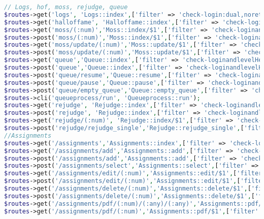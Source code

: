 \begin{lstlisting}[language=PHP, caption=Penambahan \textit{routes} yang digunakan pada aplikasi \textit{SharIF Judge}, label=kode:routesbab4]
// Logs, hof, moss, rejudge, queue
$routes->get('logs', 'Logs::index',['filter' => 'check-login:dual,noreturn']);
$routes->get('halloffame', 'Halloffame::index',['filter' => 'check-login:dual,noreturn']);
$routes->get('moss/(:num)','Moss::index/$1',['filter' => 'check-loginandlevelHead:dual,noreturn']);
$routes->post('moss/(:num)','Moss::index/$1',['filter' => 'check-loginandlevelHead:dual,noreturn']);
$routes->get('moss/update/(:num)','Moss::update/$1',['filter' => 'check-loginandlevelHead:dual,noreturn']);
$routes->post('moss/update/(:num)','Moss::update/$1',['filter' => 'check-loginandlevelHead:dual,noreturn']);
$routes->get('queue','Queue::index',['filter' => 'check-loginandlevelHead:dual,noreturn']);
$routes->post('queue','Queue::index',['filter' => 'check-loginandlevelHead:dual,noreturn']);
$routes->post('queue/resume','Queue::resume',['filter' => 'check-loginandlevelHead:dual,noreturn']);
$routes->post('queue/pause','Queue::pause',['filter' => 'check-loginandlevelHead:dual,noreturn']);
$routes->post('queue/empty_queue','Queue::empty_queue',['filter' => 'check-loginandlevelHead:dual,noreturn']);
$routes->cli('queueprocess/run', 'Queueprocess::run');
$routes->get('rejudge', 'Rejudge::index',['filter' => 'check-loginandlevelHead:dual,noreturn']);
$routes->post('rejudge', 'Rejudge::index',['filter' => 'check-loginandlevelHead:dual,noreturn']);
$routes->get('rejudge/(:num)', 'Rejudge::index/$1',['filter' => 'check-loginandlevelHead:dual,noreturn']);
$routes->post('rejudge/rejudge_single','Rejudge::rejudge_single',['filter' => 'check-loginandlevelHead:dual,noreturn']);
//Assignments
$routes->get('/assignments','Assignments::index',['filter' => 'check-login:dual,noreturn']);
$routes->get('/assignments/add','Assignments::add',['filter' => 'check-login:dual,noreturn']);
$routes->post('/assignments/add','Assignments::add',['filter' => 'check-login:dual,noreturn']);
$routes->post('/assignments/select','Assignments::select',['filter' => 'check-login:dual,noreturn']);
$routes->get('/assignments/edit/(:num)','Assignments::edit/$1',['filter' => 'check-login:dual,noreturn']);
$routes->post('/assignments/edit/(:num)','Assignments::edit/$1',['filter' => 'check-login:dual,noreturn']);
$routes->get('/assignments/delete/(:num)','Assignments::delete/$1',['filter' => 'check-login:dual,noreturn']);
$routes->post('/assignments/delete/(:num)','Assignments::delete/$1',['filter' => 'check-login:dual,noreturn']);
$routes->get('/assignments/pdf/(:num)/(:any)/(:any)','Assignments::pdf/$1/$2/$3',['filter' => 'check-login:dual,noreturn']);
$routes->get('/assignments/pdf/(:num)','Assignments::pdf/$1',['filter' => 'check-login:dual,noreturn']);

\end{lstlisting}
